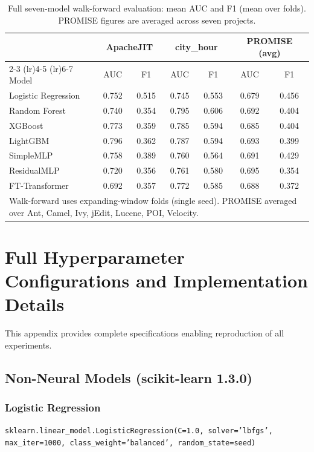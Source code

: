 \begin{table}[htbp]
\centering
\caption{Full seven-model walk-forward evaluation: mean AUC and F1 (mean over folds). PROMISE figures are averaged across seven projects.}
\label{tab:supp-wf-full}
\small
\begin{tabular}{l cc cc cc}
\toprule
 & \multicolumn{2}{c}{ApacheJIT} & \multicolumn{2}{c}{city\_hour} & \multicolumn{2}{c}{PROMISE (avg)} \\
\cmidrule(lr){2-3} \cmidrule(lr){4-5} \cmidrule(lr){6-7}
Model & AUC & F1 & AUC & F1 & AUC & F1 \\
\midrule
Logistic Regression & 0.752 & 0.515 & 0.745 & 0.553 & 0.679 & 0.456 \\
Random Forest & 0.740 & 0.354 & 0.795 & 0.606 & 0.692 & 0.404 \\
XGBoost & 0.773 & 0.359 & 0.785 & 0.594 & 0.685 & 0.404 \\
LightGBM & 0.796 & 0.362 & 0.787 & 0.594 & 0.693 & 0.399 \\
SimpleMLP & 0.758 & 0.389 & 0.760 & 0.564 & 0.691 & 0.429 \\
ResidualMLP & 0.720 & 0.356 & 0.761 & 0.580 & 0.695 & 0.354 \\
FT-Transformer & 0.692 & 0.357 & 0.772 & 0.585 & 0.688 & 0.372 \\
\bottomrule
\multicolumn{7}{l}{\footnotesize Walk-forward uses expanding-window folds (single seed). PROMISE averaged over Ant, Camel, Ivy, jEdit, Lucene, POI, Velocity.}
\end{tabular}
\end{table}


\section{Full Hyperparameter Configurations and Implementation Details}

This appendix provides complete specifications enabling reproduction of all experiments.

\subsection{Non-Neural Models (scikit-learn 1.3.0)}

\subsubsection{Logistic Regression}
\texttt{sklearn.linear\_model.LogisticRegression(C=1.0, solver='lbfgs', max\_iter=1000, class\_weight='balanced', random\_state=seed)}

